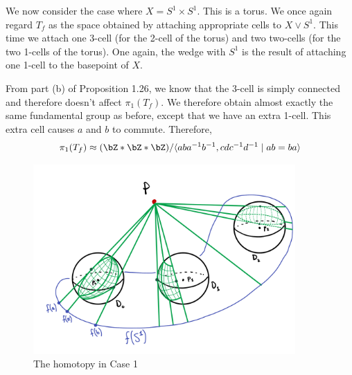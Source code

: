 \begin{homework}[e]
\begin{prf}
    \bigskip
    
    We now consider the case where $X = S^1 \times S^1$. This is a torus. We once again regard $T_f$ as the space obtained by attaching appropriate cells to $X \vee S^1$. This time we attach one 3-cell (for the 2-cell of the torus) and two two-cells (for the two 1-cells of the torus). One again, the wedge with $S^1$ is the result of attaching one 1-cell to the basepoint of $X$.
    
    From part (b) of Proposition 1.26, we know that the 3-cell is simply connected and therefore doesn't affect $\pi_1(T_f)$. We therefore obtain almost exactly the same fundamental group as before, except that we have an extra 1-cell. This extra cell causes $a$ and $b$ to commute. Therefore, 
    \begin{equation*}
        \pi_1(T_f) \approx 
        (\bZ * \bZ * \bZ) / 
        \langle aba^{-1}b^{-1}, cdc^{-1}d^{-1} \mid ab = ba \rangle
    \end{equation*}
\end{prf}
\newpage
\begin{figure}[h]
    \centering
    \includegraphics[width=10cm]{./figures/hwk2-fig1.jpg}
    \caption{The homotopy in Case 1}
    \label{fig:case1}
\end{figure}

\end{homework}


